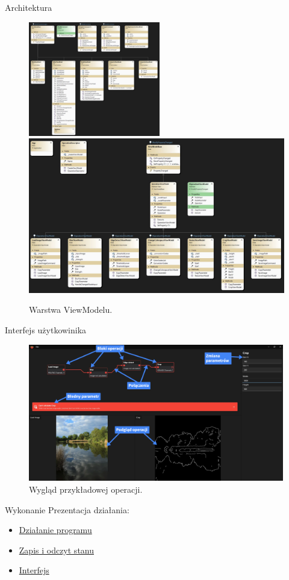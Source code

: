 \documentclass[aspectratio=1610,handout]{beamer}
\theoremstyle{definition}
\begin{document}
\begin{frame}{Architektura}
    \begin{figure}
            \includegraphics[height=5cm]{./imgs/vmedytor.jpg}%
            \hfil
            \includegraphics[height=5
            cm]{./imgs/vmoperacje.jpg}
            \caption{Warstwa ViewModelu.}
    \end{figure}
\end{frame}

\begin{frame}{Interfejs użytkowinika}
    \begin{figure}
        \includegraphics[height=6cm]{./imgs/interfejs.png}
        \caption{Wygląd przykładowej operacji.}
    \end{figure}
\end{frame}

\begin{frame}{Wykonanie}
    Prezentacja działania:
    \begin{itemize}
        \item \href{run:./imgs/long.mp4}{Działanie programu}
        \item \href{run:./imgs/opened.mp4}{Zapis i odczyt stanu}
        \item \href{run:./imgs/ui.mp4}{Interfejs}
    \end{itemize}
\end{frame}
\end{document}
